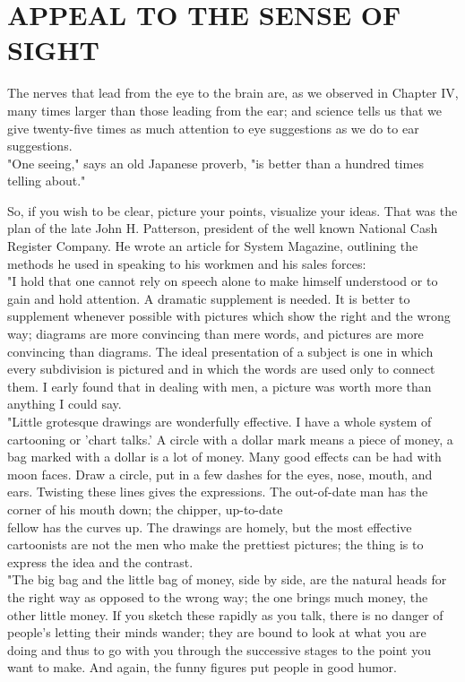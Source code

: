 \documentclass[10pt]{article}
\begin{document}
\section*{APPEAL TO THE SENSE OF SIGHT}
The nerves that lead from the eye to the brain are, as we observed in Chapter IV, many times larger than those leading from the ear; and science tells us that we give twenty-five times as much attention to eye suggestions as we do to ear suggestions.\\
"One seeing," says an old Japanese proverb, "is better than a hundred times telling about."

So, if you wish to be clear, picture your points, visualize your ideas. That was the plan of the late John H. Patterson, president of the well known National Cash Register Company. He wrote an article for System Magazine, outlining the methods he used in speaking to his workmen and his sales forces:\\
"I hold that one cannot rely on speech alone to make himself understood or to gain and hold attention. A dramatic supplement is needed. It is better to supplement whenever possible with pictures which show the right and the wrong way; diagrams are more convincing than mere words, and pictures are more convincing than diagrams. The ideal presentation of a subject is one in which every subdivision is pictured and in which the words are used only to connect them. I early found that in dealing with men, a picture was worth more than anything I could say.\\
"Little grotesque drawings are wonderfully effective. I have a whole system of cartooning or 'chart talks.' A circle with a dollar mark means a piece of money, a bag marked with a dollar is a lot of money. Many good effects can be had with moon faces. Draw a circle, put in a few dashes for the eyes, nose, mouth, and ears. Twisting these lines gives the expressions. The out-of-date man has the corner of his mouth down; the chipper, up-to-date\\
fellow has the curves up. The drawings are homely, but the most effective cartoonists are not the men who make the prettiest pictures; the thing is to express the idea and the contrast.\\
"The big bag and the little bag of money, side by side, are the natural heads for the right way as opposed to the wrong way; the one brings much money, the other little money. If you sketch these rapidly as you talk, there is no danger of people's letting their minds wander; they are bound to look at what you are doing and thus to go with you through the successive stages to the point you want to make. And again, the funny figures put people in good humor.\\
\end{document}
